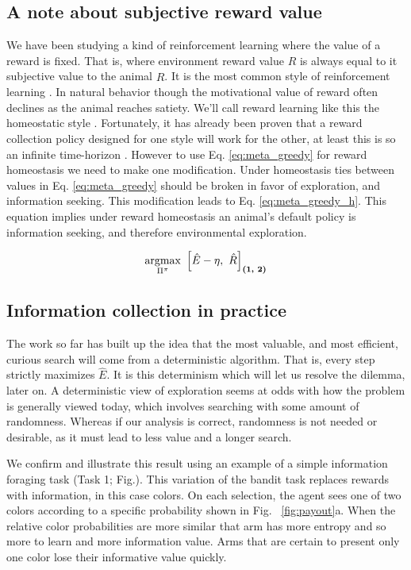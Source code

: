 \subsection{A note about subjective reward value}
We have been studying a kind of reinforcement learning where the value of a reward is fixed. That is, where environment reward value $R$ is always equal to it subjective value to the animal $\hat R$. It is the most common style of reinforcement learning \citep{Sutton2018}. In natural behavior though the motivational value of reward often declines as the animal reaches satiety. We'll call reward learning like this the homeostatic style \citep{Keramati2014,Juechems2019,Munch2020}. Fortunately, it has already been proven that a reward collection policy designed for one style will work for the other, at least this is so an infinite time-horizon \citep{Keramati2014}. However to use Eq. \ref{eq:meta_greedy} for reward homeostasis we need to make one modification. Under homeostasis ties between values in Eq. \ref{eq:meta_greedy} should be broken in favor of exploration, and information seeking. This modification leads to Eq. \ref{eq:meta_greedy_h}. This equation implies under reward homeostasis an animal's default policy is information seeking, and therefore environmental exploration.

\begin{equation}
	\label{eq:meta_greedy_h} 
	\operatorname*{argmax}_{\Pi^{\pi}} \ \Big [ \hat E - \eta,\ \hat R \Big ]_{\textbf{(1, 2)}}
\end{equation}



\subsection{Information collection in practice}
The work so far has built up the idea that the most valuable, and most efficient, curious search will come from a deterministic algorithm. That is, every step strictly maximizes $\hat E$. It is this determinism which will let us resolve the dilemma, later on. A deterministic view of exploration seems at odds with how the problem is generally viewed today, which involves searching with some amount of randomness. Whereas if our analysis is correct, randomness is not needed or desirable, as it must lead to less value and a longer search. 

We confirm and illustrate this result using an example of a simple information foraging task (Task 1; Fig.\label{fig:task_outline1}). This variation of the bandit task \citep{Sutton2018} replaces rewards with information, in this case colors. On each selection, the agent sees one of two colors according to a specific probability shown in Fig. ~\ref{fig:payout}a. When the relative color probabilities are more similar that arm has more entropy and so more to learn and more information value. Arms that are certain to present only one color lose their informative value quickly.

